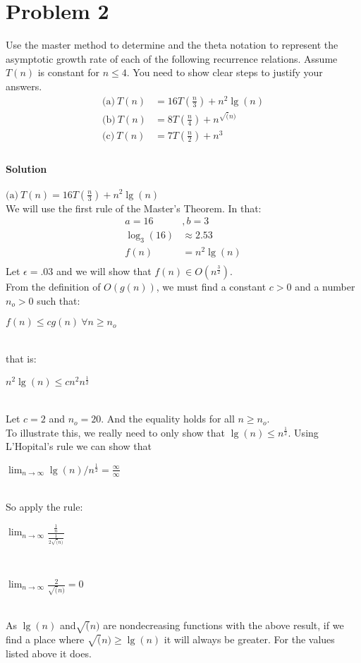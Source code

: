 \documentclass[12pt]{article}
\begin{document}
\section{Problem 2}
Use the master method to determine and the theta notation to represent the asymptotic growth rate of each of the following recurrence relations.
Assume $T(n)$ is constant for $n \leq 4$.  You need to show clear steps to justify your answers.
\begin{align*}
\text{(a)}\ T(n) & = 16 T(\frac{n}{3} ) + n^{2} \lg(n) \\
\text{(b)}\ T(n) & = 8T(\frac{n}{4} ) + n^{\sqrt(n)} \\
\text{(c)}\ T(n) & = 7T(\frac{n}{2} ) + n^{3} \\
\end{align*}

\paragraph{Solution}
$\text{(a)}\ T(n) = 16 T(\frac{n}{3} ) + n^{2} \lg(n)$ \\
We will use the first rule of the Master's Theorem.  In that: \\
\begin{align*}
a  = 16 &,
 b  = 3   \\
 \log_3(16) & \approx 2.53 \\
f(n) & = n^{2} \lg(n) \\
\end{align*}
Let $\epsilon = .03$ and we will show that $f(n) \in O( n^{\frac{3}{2}})$.\\
From the definition of $O(g(n) )$, we must find a constant $c >0$ and a number $n_o > 0 $ such that: \\
\centerline{$f(n) \leq c g(n) ~ \forall n \geq n_o$} \\
that is: \\
\centerline{$n^{2}\lg(n) \leq c n^{2}n^{\frac{1}{2}}$}\\
  Let $c = 2$ and $n_o = 20$. And the equality holds for all $n \geq n_o$.   \\
To illustrate this, we really need to only show that $\lg(n) \leq n^{\frac{1}{2}}$.
Using L'Hopital's rule we can show that\\
 \centerline{$\lim_{n \rightarrow \infty} \lg(n) / n^{\frac{1}{2}} = \frac{\infty}{\infty}$}\\
So apply the rule:\\
\centerline{$\lim_{n \rightarrow \infty} \frac{\frac{1}{n}}{ \frac{1}{2 \sqrt(n)}}$}\\
\centerline{$\lim_{n \rightarrow \infty} \frac{ 2}{\sqrt(n)} =  0$}\\
As $\lg(n)$ and$ \sqrt(n)$ are nondecreasing functions with the above result, if we find a place where $\sqrt(n) \geq \lg(n)$ it will always be greater.  For the values listed above it does.
\end{document}
